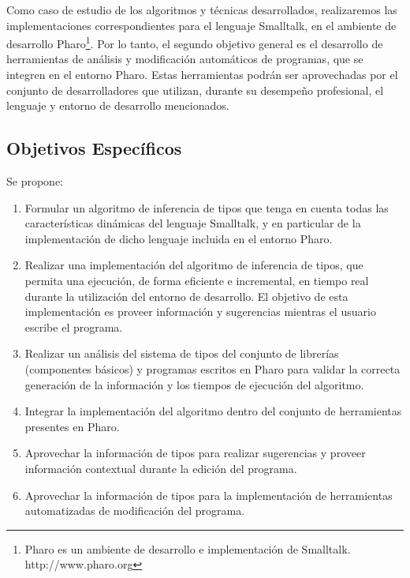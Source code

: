 \documentclass[a4paper,10pt]{article}
\begin{document}
Como caso de estudio de los algoritmos y técnicas desarrollados, realizaremos las implementaciones correspondientes para el lenguaje Smalltalk, en el ambiente de desarrollo Pharo\footnote{Pharo es un ambiente de desarrollo e implementación de Smalltalk. http://www.pharo.org }.
Por lo tanto, el segundo objetivo general es el desarrollo de herramientas de análisis y modificación automáticos de programas, que se integren en el entorno Pharo. Estas herramientas podrán ser aprovechadas por el conjunto de desarrolladores que utilizan, durante su desempeño profesional, el lenguaje y entorno de desarrollo mencionados.


\subsection{Objetivos Específicos}

Se propone:

\begin{enumerate}
 \item Formular un algoritmo de inferencia de tipos que tenga en cuenta todas las características dinámicas del lenguaje Smalltalk, y en particular de la implementación de dicho lenguaje incluida en el entorno Pharo.
 
 \item Realizar una implementación del algoritmo de inferencia de tipos, que permita una ejecución, de forma eficiente e incremental, en tiempo real durante la utilización del entorno de desarrollo. El objetivo de esta implementación es proveer información y sugerencias mientras el usuario escribe el programa.
 
 \item Realizar un análisis del sistema de tipos del conjunto de librerías (componentes básicos) y programas escritos en Pharo para validar la correcta generación de la información y los tiempos de ejecución del algoritmo.
 
 \item Integrar la implementación del algoritmo dentro del conjunto de herramientas presentes en Pharo.
 
 \item Aprovechar la información de tipos para realizar sugerencias y proveer información contextual durante la edición del programa.

 \item Aprovechar la información de tipos para la implementación de herramientas automatizadas de modificación del programa. 
\end{enumerate}
\end{document}
